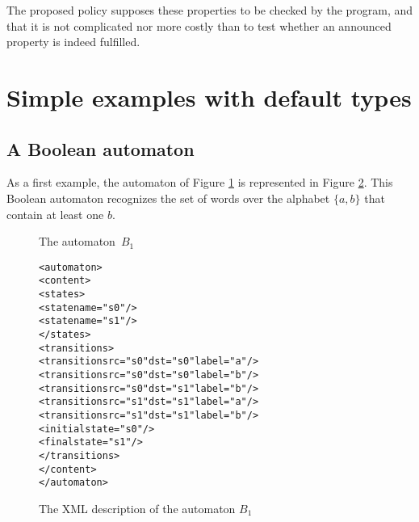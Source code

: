 \documentclass[a4paper]{article}
\newcommand{\medskipneg}{\vspace*{-2ex}} %
\def\dstname{\texttt{dst}}
\def\srcname{\texttt{src}}
\begin{document}
The proposed policy supposes these properties to be checked by the program, and that it is
not complicated nor more costly than to test whether an announced property is indeed fulfilled.

\section{Simple examples with default types}
\subsection{A Boolean automaton}

As a first example, the automaton of Figure \ref{B1} is represented in
Figure \ref{B1xml}. This Boolean automaton recognizes the set of
words over the alphabet $\{a,b\}$ that contain at least one $b$.\\

\begin{figure}[ht]
\begin{center}
\end{center}
\vspace*{-.8cm}
\caption{The automaton~$B_1$}\label{B1}
\medskipneg
\end{figure}

{\small

\begin{figure}[h]
  \begin{center}
\begin{alltt}
<automaton>
  <content>
    <states>
       <state name="s0"/>
       <state name="s1"/>
    </states>
    <transitions>
       <transition \srcname{}="s0" \dstname{}="s0" label="a"/>
       <transition \srcname{}="s0" \dstname{}="s0" label="b"/>
       <transition \srcname{}="s0" \dstname{}="s1" label="b"/>
       <transition \srcname{}="s1" \dstname{}="s1" label="a"/>
       <transition \srcname{}="s1" \dstname{}="s1" label="b"/>
       <initial state="s0"/>
       <final state="s1"/>
    </transitions>
  </content>
</automaton>
\end{alltt}

\caption{The XML description of the automaton $B_1$}
\label{B1xml}
  \end{center}
\end{figure}
}
\end{document}
